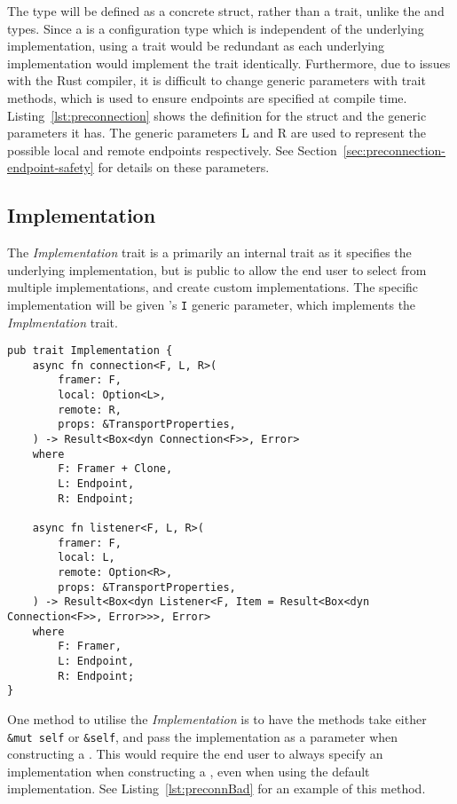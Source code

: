 The \preconnection{} type will be defined as a concrete struct, rather than a trait, unlike the \listener{} and
\connection{} types.
Since a \preconnection{} is a configuration type which is independent of the underlying implementation, using a
trait would be redundant as each underlying implementation would implement the trait identically.
Furthermore, due to issues with the Rust compiler, it is difficult to change generic parameters with trait methods,
which is used to ensure endpoints are specified at compile time.
Listing~\ref{lst:preconnection} shows the definition for the \preconnection{} struct and the generic parameters it
has.
The generic parameters L and R are used to represent the possible local and remote endpoints respectively.
See Section~\ref{sec:preconnection-endpoint-safety} for details on these parameters.

\subsection{Implementation}\label{subsec:implementation}
The \emph{Implementation} trait is a primarily an internal trait as it specifies the underlying implementation, but is
public to allow the end user to select from multiple implementations, and create custom implementations.
The specific implementation will be given \preconnection{}'s \texttt{I} generic parameter, which implements the
\emph{Implmentation} trait.

\begin{lstlisting}[float=h, label=lst:impl, caption={The Implementation trait.}]
pub trait Implementation {
    async fn connection<F, L, R>(
        framer: F,
        local: Option<L>,
        remote: R,
        props: &TransportProperties,
    ) -> Result<Box<dyn Connection<F>>, Error>
    where
        F: Framer + Clone,
        L: Endpoint,
        R: Endpoint;

    async fn listener<F, L, R>(
        framer: F,
        local: L,
        remote: Option<R>,
        props: &TransportProperties,
    ) -> Result<Box<dyn Listener<F, Item = Result<Box<dyn Connection<F>>, Error>>>, Error>
    where
        F: Framer,
        L: Endpoint,
        R: Endpoint;
}
\end{lstlisting}

One method to utilise the \emph{Implementation} is to have the methods take either \texttt{\&mut self} or
\texttt{\&self}, and pass the implementation as a parameter when constructing a \preconnection{}.
This would require the end user to always specify an implementation when constructing a \preconnection{}, even when
using the default implementation.
See Listing~\ref{lst:preconnBad} for an example of this method.

